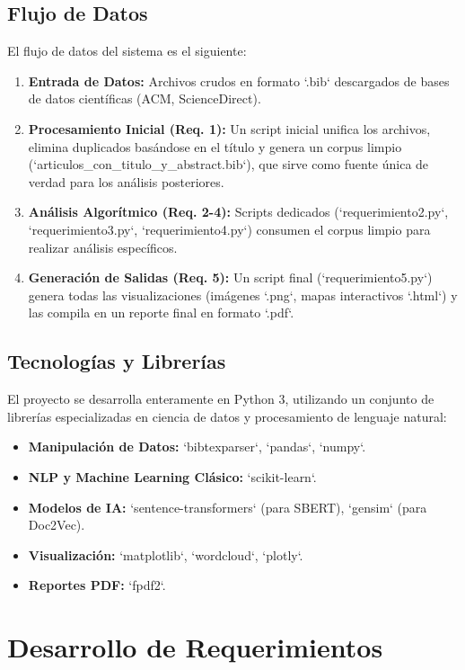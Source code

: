 \documentclass[12pt, a4paper]{article}
\begin{document}
\subsection{Flujo de Datos}
El flujo de datos del sistema es el siguiente:
\begin{enumerate}
    \item \textbf{Entrada de Datos:} Archivos crudos en formato `.bib` descargados de bases de datos científicas (ACM, ScienceDirect).
    \item \textbf{Procesamiento Inicial (Req. 1):} Un script inicial unifica los archivos, elimina duplicados basándose en el título y genera un corpus limpio (`articulos\_con\_titulo\_y\_abstract.bib`), que sirve como fuente única de verdad para los análisis posteriores.
    \item \textbf{Análisis Algorítmico (Req. 2-4):} Scripts dedicados (`requerimiento2.py`, `requerimiento3.py`, `requerimiento4.py`) consumen el corpus limpio para realizar análisis específicos.
    \item \textbf{Generación de Salidas (Req. 5):} Un script final (`requerimiento5.py`) genera todas las visualizaciones (imágenes `.png`, mapas interactivos `.html`) y las compila en un reporte final en formato `.pdf`.
\end{enumerate}

\subsection{Tecnologías y Librerías}
El proyecto se desarrolla enteramente en Python 3, utilizando un conjunto de librerías especializadas en ciencia de datos y procesamiento de lenguaje natural:
\begin{itemize}
    \item \textbf{Manipulación de Datos:} `bibtexparser`, `pandas`, `numpy`.
    \item \textbf{NLP y Machine Learning Clásico:} `scikit-learn`.
    \item \textbf{Modelos de IA:} `sentence-transformers` (para SBERT), `gensim` (para Doc2Vec).
    \item \textbf{Visualización:} `matplotlib`, `wordcloud`, `plotly`.
    \item \textbf{Reportes PDF:} `fpdf2`.
\end{itemize}

\section{Desarrollo de Requerimientos}
\end{document}
